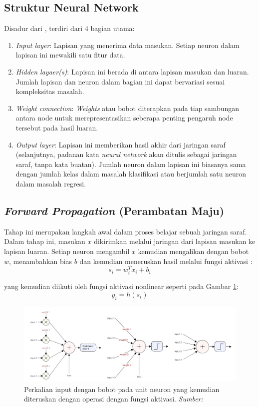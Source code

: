 \subsection{Struktur Neural Network}
Disadur dari \cite{aurélien_géron_2022}, terdiri dari 4 bagian utama:
\begin{enumerate}
    \item \emph{Input layer}: Lapisan yang menerima data masukan. Setiap neuron dalam lapisan ini mewakili satu fitur data.
    \item \emph{Hidden layaer(s)}: Lapisan ini berada di antara lapisan masukan dan luaran. Jumlah lapisan dan neuron dalam bagian ini dapat bervariasi sesuai kompleksitas masalah.
    \item \emph{Weight connection}: \emph{Weights} atau bobot diterapkan pada tiap sambungan antara node untuk merepresentasikan seberapa penting pengaruh node tersebut pada hasil luaran.
    \item \emph{Output layer}: Lapisan ini memberikan hasil akhir dari jaringan saraf (selanjutnya, padanan kata \emph{neural network} akan ditulis sebagai jaringan saraf, tanpa kata buatan). Jumlah neuron dalam lapisan ini biasanya sama dengan jumlah kelas dalam masalah klasifikasi atau berjumlah satu neuron dalam masalah regresi.
\end{enumerate}

\subsection{\emph{Forward Propagation} (Perambatan Maju)}
Tahap ini merupakan langkah awal dalam proses belajar sebuah jaringan saraf. Dalam tahap ini, masukan $x$ dikirimkan melalui jaringan dari lapisan masukan ke lapisan luaran. Setiap neuron mengambil $x$ kemudian mengalikan dengan bobot $w$, menambahkan bias $b$ dan kemudian meneruskan hasil melalui fungsi aktivasi \citep{goodfellow_bengio_courville_2016}:
\begin{equation}
    s_i = w_i^T x_i +b_i
\end{equation}

yang kemudian diikuti oleh fungsi aktivasi nonlinear seperti pada Gambar \ref{feedforward}:
\begin{equation}
    y_i = h(s_i)
\end{equation}

\begin{figure}[h]
    \centering
    \includegraphics[width=12cm]{gambar/feedforward.png}
    \caption{Perkalian input dengan bobot pada unit neuron yang kemudian diteruskan dengan operasi dengan fungsi aktivasi. \emph{Sumber: \cite{szeliski_2011}}}
    \label{feedforward}
\end{figure}

